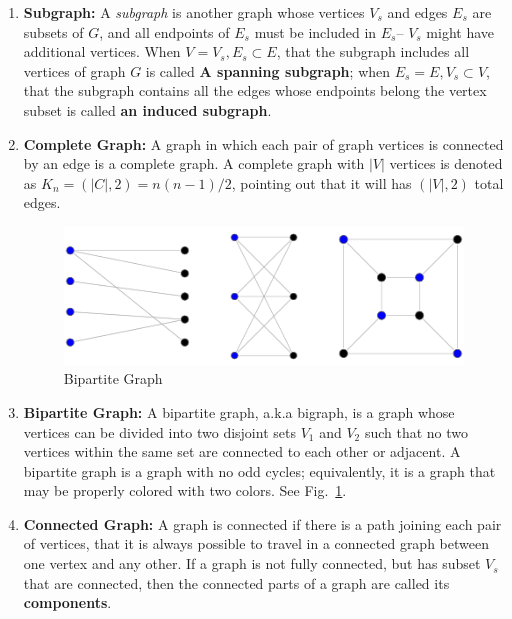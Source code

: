 \documentclass[../main.tex]{subfiles}
\begin{document}
\begin{enumerate}
    \item \textbf{Subgraph:} A \textit{subgraph}  is another graph whose vertices $V_s$ and  edges $E_s$  are subsets of $G$, and all endpoints of $E_s$ must be included in $E_s$-- $V_s$ might have  additional vertices. When $V=V_s, E_s \subset E$, that the subgraph includes all vertices of graph $G$ is called  \textbf{A spanning subgraph}; when $E_s=E, V_s\subset V$, that the subgraph contains all the edges whose endpoints belong the vertex subset is called \textbf{an induced subgraph}. 
    \item \textbf{Complete Graph:} A graph in which each pair of graph vertices is connected by an edge is a complete graph. A complete graph with $|V|$ vertices is denoted as $K_n = (|C|, 2) = n(n-1)/2$, pointing out that it will has $(|V|,2)$ total edges. 
    
    \begin{figure}[!ht]
    \centering
    \includegraphics[width=0.7\columnwidth]{fig/BipartiteGraph_1000.png}
    \caption{Bipartite Graph}
    \label{bipartite_graph}
\end{figure}
    \item \textbf{Bipartite Graph:} A bipartite graph, a.k.a bigraph, is a graph whose vertices can be divided into two disjoint sets $V_1$ and $V_2$ such that no two vertices within the same set are connected to each other or adjacent. A bipartite graph is a graph with no odd cycles; equivalently, it is a graph that may be properly colored with two colors. See Fig.~\ref{bipartite_graph}.
    \item \textbf{Connected Graph:} A graph is connected if there is a path joining each pair of vertices, that it is always possible to travel in a connected graph between one vertex and any other. If a graph is not fully connected, but has subset $V_s$ that are connected, then the connected parts of a graph are called its \textbf{components}. 

\end{enumerate}
\end{document}
